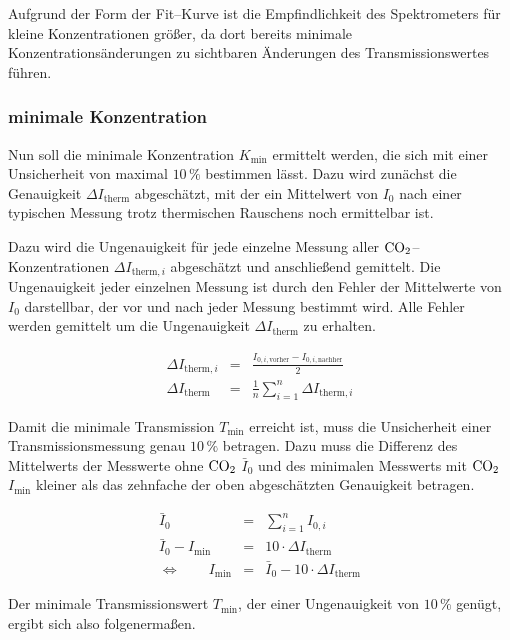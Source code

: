 \documentclass[12pt,a4paper]{scrartcl}
\numberwithin{equation}{section} %
\begin{document}
Aufgrund der Form der Fit--Kurve ist die Empfindlichkeit des Spektrometers für kleine Konzentrationen größer, da dort bereits minimale Konzentrationsänderungen zu sichtbaren Änderungen des Transmissionswertes führen.

\subsubsection{minimale Konzentration}
\label{minimale Konzentration}
Nun soll die minimale Konzentration $K_\mathrm{min}$ ermittelt werden, die sich mit einer Unsicherheit von maximal $10 \mathrm{\,\%}$ bestimmen lässt. Dazu wird zunächst die Genauigkeit $\Delta I_\mathrm{therm}$ abgeschätzt, mit der ein Mittelwert von $I_0$ nach einer typischen Messung trotz thermischen Rauschens noch ermittelbar ist.

Dazu wird die Ungenauigkeit für jede einzelne Messung aller $\ce{CO_2}$--Konzentrationen $\Delta I_{\mathrm{therm}, i}$ abgeschätzt und anschließend gemittelt. Die Ungenauigkeit jeder einzelnen Messung ist durch den Fehler der Mittelwerte von $I_0$ darstellbar, der vor und nach jeder Messung bestimmt wird. Alle Fehler werden gemittelt um die Ungenauigkeit $\Delta I_\mathrm{therm}$ zu erhalten.

\begin{eqnarray}
	\Delta I_{\mathrm{therm}, i} &=& \frac{I_{0, i, \mathrm{vorher}} - I_{0, i, \mathrm{nachher}}}{2} \\
	\Delta I_\mathrm{therm} &=& \frac{1}{n} \sum_{i = 1}^{n} \Delta I_{\mathrm{therm}, i}
\end{eqnarray}

\noindent
Damit die minimale Transmission $T_\mathrm{min}$ erreicht ist, muss die Unsicherheit einer Transmissionsmessung genau $10 \mathrm{\, \%}$ betragen. Dazu muss die Differenz des Mittelwerts der Messwerte ohne $\ce{CO_2}$ $\bar{I}_{0}$ und des minimalen Messwerts mit $\ce{CO_2}$ $I_\mathrm{min}$ kleiner als das zehnfache der oben abgeschätzten Genauigkeit betragen.

\begin{eqnarray}
	\bar{I}_0 &=& \sum_{i=1}^{n} I_{0, i} \\
	\bar{I}_0 - I_\mathrm{min} &=& 10 \cdot \Delta I_\mathrm{therm} \\
	\Leftrightarrow \qquad I_\mathrm{min} &=& \bar{I}_0 - 10 \cdot \Delta I_\mathrm{therm}
\end{eqnarray}

\noindent
Der minimale Transmissionswert $T_\mathrm{min}$, der einer Ungenauigkeit von $10 \mathrm{\, \%}$ genügt, ergibt sich also folgenermaßen.
\end{document}
